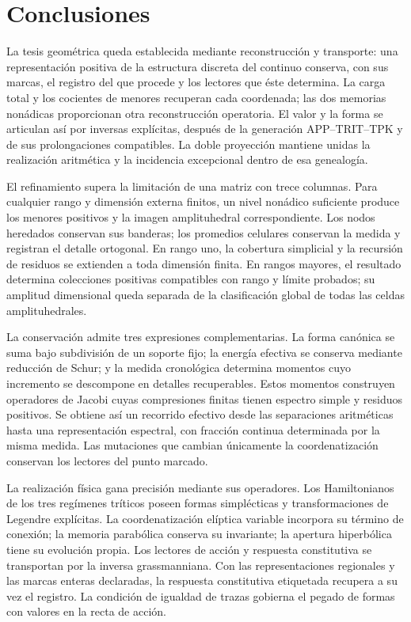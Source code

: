 \clearpage
\section{Conclusiones}
\label{sec:conclusions-final}
\begingroup
\fontsize{10.2}{12.8}\selectfont
\setlength{\parskip}{3pt plus .5pt}

La tesis geométrica queda establecida mediante reconstrucción y transporte:
una representación positiva de la estructura discreta del continuo conserva,
con sus marcas, el registro del que procede y los lectores que éste
determina. La carga total y los cocientes de menores recuperan cada
coordenada; las dos memorias nonádicas proporcionan otra reconstrucción
operatoria. El valor y la forma se articulan así por inversas explícitas,
después de la generación APP--TRIT--TPK y de sus prolongaciones compatibles.
La doble proyección mantiene unidas la realización aritmética y la
incidencia excepcional dentro de esa genealogía.

El refinamiento supera la limitación de una matriz con trece columnas.
Para cualquier rango y dimensión externa finitos, un nivel nonádico
suficiente produce los menores positivos y la imagen amplituhedral
correspondiente. Los nodos heredados conservan sus banderas; los
promedios celulares conservan la medida y registran el detalle
ortogonal. En rango uno, la cobertura simplicial y la recursión de
residuos se extienden a toda dimensión finita. En rangos mayores,
el resultado determina colecciones positivas compatibles con rango y
límite probados; su amplitud dimensional queda separada de la
clasificación global de todas las celdas amplituhedrales.

La conservación admite tres expresiones complementarias. La forma
canónica se suma bajo subdivisión de un soporte fijo; la energía
efectiva se conserva mediante reducción de Schur; y la medida
cronológica determina momentos cuyo incremento se descompone en
detalles recuperables. Estos momentos construyen operadores de
Jacobi cuyas compresiones finitas tienen espectro simple y residuos positivos. Se obtiene así
un recorrido efectivo desde las separaciones aritméticas hasta una
representación espectral, con fracción continua determinada por la
misma medida. Las mutaciones que cambian únicamente la coordenatización
conservan los lectores del punto marcado.

La realización física gana precisión mediante sus operadores. Los
Hamiltonianos de los tres regímenes tríticos poseen formas
simplécticas y transformaciones de Legendre explícitas. La coordenatización
elíptica variable incorpora su término de conexión; la memoria
parabólica conserva su invariante; la apertura hiperbólica tiene
su evolución propia. Los lectores de acción y respuesta
constitutiva se transportan por la inversa grassmanniana. Con
las representaciones regionales y las marcas enteras declaradas,
la respuesta constitutiva etiquetada recupera a su vez el registro.
La condición de igualdad de trazas gobierna el pegado de formas
con valores en la recta de acción.

